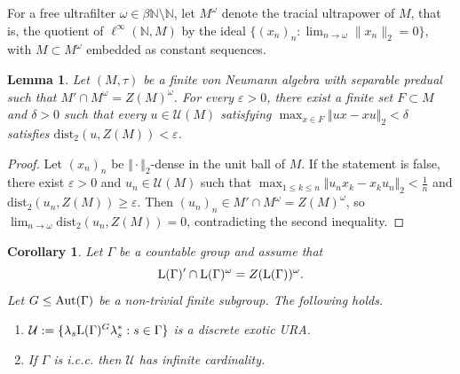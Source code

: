 \documentclass[12pt]{amsart} %
\theoremstyle{plain}
\newtheorem{lemma}[theorem]{Lemma}
\newtheorem{corollary}[theorem]{Corollary}
\theoremstyle{definition}
\newcommand{\N}{\mathbb{N}}
\newcommand{\LL}{{\rm L}}
\newcommand{\Aut}{{\rm Aut}}
\newcommand{\Ucal}{\mathcal{U}}
\newcommand{\dist}{\mathrm{dist}}
\begin{document}
\noindent For a free ultrafilter $\omega\in\beta\N\setminus\N$, let $M^\omega$
denote the tracial ultrapower of $M$, that is, the quotient of
$\ell^\infty(\N,M)$ by the ideal
$\{(x_n)_n:\lim_{n\to\omega}\|x_n\|_2=0\}$, with $M\subset M^\omega$ embedded as
constant sequences.
\begin{lemma}\label{lem:full-factor-unitary-gap}
Let $(M,\tau)$ be a finite von Neumann algebra with separable predual such
that $M'\cap M^\omega=Z(M)^\omega$. For every $\varepsilon>0$, there exist a finite
set $F\subset M$ and $\delta>0$ such that every $u\in\Ucal(M)$ satisfying
$\max_{x\in F}\Vert ux-xu\Vert_2<\delta$
satisfies $\dist_2(u,Z(M))<\varepsilon$.
\end{lemma}
\begin{proof}
Let $(x_n)_n$ be $\Vert\cdot\Vert_2$-dense in the unit
ball of $M$. If the statement is false, there exist $\varepsilon>0$ and $u_n\in\Ucal(M)$ such that $\max_{1\leq k\leq n}\Vert u_nx_k-x_ku_n\Vert_2<\frac1n$ and $\dist_2(u_n,Z(M))\geq\varepsilon$. Then $(u_n)_n\in M'\cap M^\omega=Z(M)^\omega$, so
$\lim_{n\to\omega}\dist_2(u_n,Z(M))=0$, contradicting the second inequality.
\end{proof}
\begin{corollary}\label{cor:fixed-point-ura}
Let $\Gamma$ be a countable group and assume that
$$
\LL(\Gamma)'\cap\LL(\Gamma)^\omega
=Z(\LL(\Gamma))^\omega.
$$
Let $G\leq\Aut(\Gamma)$ be a non-trivial finite subgroup. The following
holds.
\begin{enumerate}
\item $\mathcal U
:=\{\lambda_s\LL(\Gamma)^G\lambda_s^*:s\in\Gamma\}$ is a discrete exotic URA.
\item If $\Gamma$ is i.c.c. then $\mathcal U$ has
infinite cardinality.
\end{enumerate}
\end{corollary}
\end{document}
